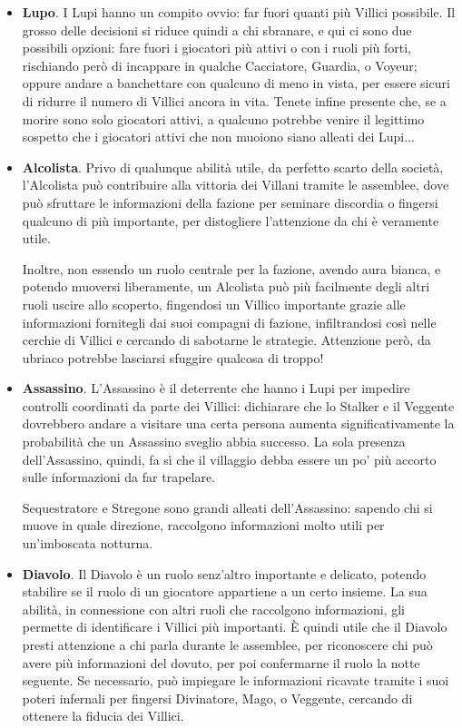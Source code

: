 \documentclass[a4paper,10pt]{article}
\begin{document}
\begin{itemize}

    \item {\bf Lupo}. I Lupi hanno un compito ovvio: far fuori quanti più Villici possibile. Il grosso delle decisioni si riduce quindi a chi sbranare, e qui ci sono due possibili opzioni: fare fuori i giocatori più attivi o con i ruoli più forti, rischiando però di incappare in qualche Cacciatore, Guardia, o Voyeur; oppure andare a banchettare con qualcuno di meno in vista, per essere sicuri di ridurre il numero di Villici ancora in vita. Tenete infine presente che, se a morire sono solo giocatori attivi, a qualcuno potrebbe venire il legittimo sospetto che i giocatori attivi che non muoiono siano alleati dei Lupi...

	\item {\bf Alcolista}. Privo di qualunque abilità utile, da perfetto scarto della società, l'Alcolista può contribuire alla vittoria dei Villani tramite le assemblee, dove può sfruttare le informazioni della fazione per seminare discordia o fingersi qualcuno di più importante, per distogliere l'attenzione da chi è veramente utile.
	
	Inoltre, non essendo un ruolo centrale per la fazione, avendo aura bianca, e potendo muoversi liberamente, un Alcolista può più facilmente degli altri ruoli uscire allo scoperto, fingendosi un Villico importante grazie alle informazioni fornitegli dai suoi compagni di fazione, infiltrandosi così nelle cerchie di Villici e cercando di sabotarne le strategie. Attenzione però, da ubriaco potrebbe lasciarsi sfuggire qualcosa di troppo!
	
	\item {\bf Assassino}. L'Assassino è il deterrente che hanno i Lupi per impedire controlli coordinati da parte dei Villici: dichiarare che lo Stalker e il Veggente dovrebbero andare a visitare una certa persona aumenta significativamente la probabilità che un Assassino sveglio abbia successo. La sola presenza dell'Assassino, quindi, fa sì che il villaggio debba essere un po' più accorto sulle informazioni da far trapelare.
	
	Sequestratore e Stregone sono grandi alleati dell'Assassino: sapendo chi si muove in quale direzione, raccolgono informazioni molto utili per un'imboscata notturna. 
	
	\item {\bf Diavolo}. Il Diavolo è un ruolo senz'altro importante e delicato, potendo stabilire se il ruolo di un giocatore appartiene a un certo insieme. La sua abilità, in connessione con altri ruoli che raccolgono informazioni, gli permette di identificare i Villici più importanti. È quindi utile che il Diavolo presti attenzione a chi parla durante le assemblee, per riconoscere chi può avere più informazioni del dovuto, per poi confermarne il ruolo la notte seguente. Se necessario, può impiegare le informazioni ricavate tramite i suoi poteri infernali per fingersi Divinatore, Mago, o Veggente, cercando di ottenere la fiducia dei Villici.
	

\end{itemize}
\end{document}
